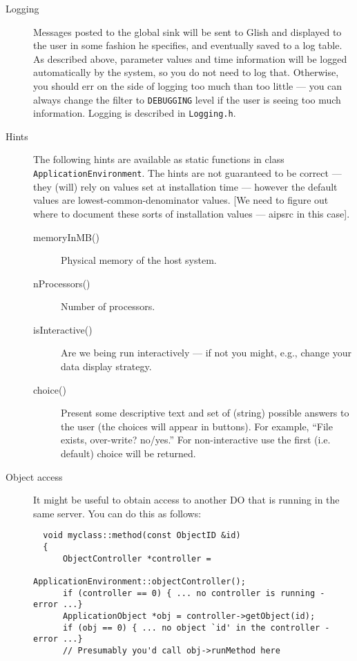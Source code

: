 \begin{description}
  \item[Logging] Messages posted to the global sink will be sent to
  Glish and displayed to the user in some fashion he specifies, and
  eventually saved to a log table. As described above, parameter
  values and time information will be logged automatically by the
  system, so you do not need to log that. Otherwise, you should err on
  the side of logging too much than too little --- you can always
  change the filter to {\tt DEBUGGING} level if the user is seeing too
  much information. Logging is described in {\tt Logging.h}.
  
  \item[Hints] The following hints are available as static functions
  in class {\tt ApplicationEnvironment}. The hints are not guaranteed to
  be correct --- they (will) rely on values set at installation time
  --- however the default values are lowest-common-denominator values.
  [We need to figure out where to document these sorts of installation
   values --- aipsrc in this case].
  \begin{description}
      \item[memoryInMB()] Physical memory of the host system.
      \item[nProcessors()] Number of processors.
      \item[isInteractive()] Are we being run interactively --- if not
                             you might, e.g., change your data display
                             strategy.
      \item[choice()] Present some descriptive text and set of (string)
      possible answers to the user (the choices will appear in buttons).
      For example, ``File exists, over-write? no/yes.'' For non-interactive
      use the first (i.e. default) choice will be returned.
  \end{description}
  \item[Object access] It might be useful to obtain access to another 
  DO that is running in the same server. You can do this as follows:
  \begin{verbatim}
  void myclass::method(const ObjectID &id)
  {
      ObjectController *controller = 
                           ApplicationEnvironment::objectController();
      if (controller == 0) { ... no controller is running - error ...}
      ApplicationObject *obj = controller->getObject(id);
      if (obj == 0) { ... no object `id' in the controller - error ...}
      // Presumably you'd call obj->runMethod here

\end{verbatim}
\end{description}
